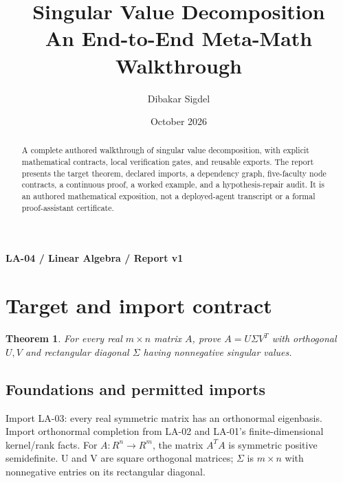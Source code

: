 \documentclass[preprint,12pt,aps,pra,showkeys,amsmath,amssymb,superscriptaddress,floatfix]{revtex4-2}
\newtheorem{theorem}{Theorem}[section]
\theoremstyle{definition}
\theoremstyle{remark}
\begin{document}
\title{Singular Value Decomposition\\[4pt]\large An End-to-End Meta-Math Walkthrough}

\author{Dibakar Sigdel}


\date{October 2026}

\begin{abstract}

A complete authored walkthrough of singular value decomposition, with
explicit mathematical contracts, local verification gates, and reusable
exports. The report presents the target theorem, declared imports, a
dependency graph, five-faculty node contracts, a continuous proof, a
worked example, and a hypothesis-repair audit. It is an authored
mathematical exposition, not a deployed-agent transcript or a formal
proof-assistant certificate.

\end{abstract}\maketitle\linespread{1.12}\selectfont

\noindent\textbf{LA-04 / Linear Algebra / Report v1}

\section{Target and import contract}

\begin{theorem}

For every real \(m\times n\) matrix \(A\), prove \(A=U\Sigma V^T\) with
orthogonal \(U,V\) and rectangular diagonal \(\Sigma\) having
nonnegative singular values.

\end{theorem}

\subsection{Foundations and permitted imports}

Import LA-03: every real symmetric matrix has an orthonormal eigenbasis.
Import orthonormal completion from LA-02 and LA-01's finite-dimensional
kernel/rank facts. For \(A:R^{n}\to R^{m}\), the matrix \(A^{T}A\) is
symmetric positive semidefinite. U and V are square orthogonal matrices;
\(\Sigma\) is \(m\times n\) with nonnegative entries on its rectangular
diagonal.
\end{document}
